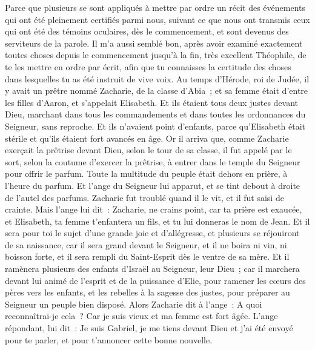 \begin{multicols}{2}
\VerseOne{}Parce que plusieurs se sont appliqués à mettre par ordre un récit des événements qui ont été pleinement certifiés parmi nous,
suivant ce que nous ont transmis ceux qui ont été des témoins oculaires, dès le commencement, et sont devenus des serviteurs de la parole.
Il m'a aussi semblé bon, après avoir examiné exactement toutes choses depuis le commencement jusqu'à la fin, très excellent Théophile, de te les mettre en ordre par écrit,
afin que tu connaisses la certitude des choses dans lesquelles tu as été instruit de vive voix.
Au temps d'Hérode, roi de Judée, il y avait un prêtre nommé Zacharie, de la classe d'Abia~; et sa femme était d'entre les filles d'Aaron, et s'appelait Elisabeth.
Et ils étaient tous deux justes devant Dieu, marchant dans tous les commandements et dans toutes les ordonnances du Seigneur, sans reproche.
Et ils n'avaient point d'enfants, parce qu'Elisabeth était stérile et qu'ils étaient fort avancés en âge.
Or il arriva que, comme Zacharie exerçait la prêtrise devant Dieu, selon le tour de sa classe, il fut appelé par le sort,
selon la coutume d'exercer la prêtrise, à entrer dans le temple du Seigneur pour offrir le parfum.
Toute la multitude du peuple était dehors en prière, à l'heure du parfum.
Et l'ange du Seigneur lui apparut, et se tint debout à droite de l'autel des parfums.
Zacharie fut troublé quand il le vit, et il fut saisi de crainte.
Mais l'ange lui dit~: Zacharie, ne crains point, car ta prière est exaucée, et Elisabeth, ta femme t'enfantera un fils, et tu lui donneras le nom de Jean.
Et il sera pour toi le sujet d'une grande joie et d'allégresse, et plusieurs se réjouiront de sa naissance,
car il sera grand devant le Seigneur, et il ne boira ni vin, ni boisson forte, et il sera rempli du Saint-Esprit dès le ventre de sa mère.
Et il ramènera plusieurs des enfants d'Israël au Seigneur, leur Dieu~;
car il marchera devant lui animé de l'esprit et de la puissance d'Elie, pour ramener les cœurs des pères vers les enfants, et les rebelles à la sagesse des justes, pour préparer au Seigneur un peuple bien disposé.
Alors Zacharie dit à l'ange~: A quoi reconnaîtrai-je cela~? Car je suis vieux et ma femme est fort âgée.
L'ange répondant, lui dit~: Je suis Gabriel, je me tiens devant Dieu et j'ai été envoyé pour te parler, et pour t'annoncer cette bonne nouvelle.

\end{multicols}
